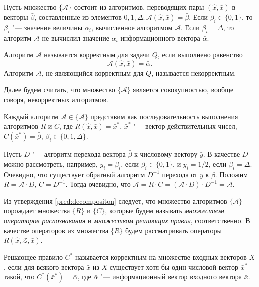 Пусть множество $\{\mathcal{A}\}$ состоит из алгоритмов, переводящих пары $(\hat{x},\bar{x})$ в векторы $\bar{\beta}$, составленные из элементов $0,1,\Delta:\mathcal{A}(\hat{x},\bar{x})=\bar{\beta}$. Если $\beta_i\in\{0,1\}$, то $\beta_i$ "--- значение величины $\alpha_i$, вычисленное алгоритмом $\mathcal{A}$. Если $\beta_i=\Delta$, то алгоритм $\mathcal{A}$ не вычислил значение $\alpha_i$ информационного вектора $\bar\alpha$.
	
\begin{Def}
	Алгоритм $\mathcal{A}$ называется корректным для задачи $Q$, если выполнено равенство
	\begin{equation}
		\mathcal{A}(\hat{x},\bar{x})=\bar{\alpha}.
	\end{equation}
	Алгоритм $\mathcal{A}$, не являющийся корректным для $Q$, называется некорректным.
\end{Def}

Далее будем считать, что множество $\{\mathcal{A}\}$ является совокупностью, вообще говоря, некорректных алгоритмов.
	
\begin{Pred}
	\label{pred:decompositon}
	Каждый алгоритм $\mathcal{A}\in\{\mathcal{A}\}$ представим как последовательность выполнения алгоритмов $R$ и $C$, где $R(\hat{x},\bar{x})=\bar{x}^*$, $\bar{x}^*$ "--- вектор действительных чисел, $C(\bar{x}^*)=\bar{\beta}$, $\beta_i\in\{0,1,\Delta\}$.
\end{Pred}
	
\begin{Proof}
	Пусть $D$ "--- алгоритм перехода вектора $\bar{\beta}$ к числовому вектору $\bar{y}$. В качестве $D$ можно рассмотреть, например, $y_i=\beta_i$, если $\beta_i\in\{0,1\}$, и $y_i=1/2$, если $\beta_i=\Delta$. Очевидно, что существует обратный алгоритм $D^{-1}$ перехода от $\bar{y}$ к $\bar{\beta}$. Положим $R=\mathcal{A}{\cdot}D$, $C=D^{-1}$. Тогда очевидно, что $\mathcal{A}=R{\cdot}C=(\mathcal{A}{\cdot}D){\cdot}D^{-1}=\mathcal{A}$.
\end{Proof}

Из утверждения \ref{pred:decompositon} следует, что множество алгоритмов $\{\mathcal{A}\}$ порождает множества $\{R\}$ и $\{C\}$, которые будем называть \textit{множеством операторов распознавания} и \textit{множеством решающих правил}, соответственно. В качестве операторов из множества $\{R\}$ будем рассматривать операторы $R(\hat{x},\mathcal{Z},\bar{x})$.
	
\begin{Def}
	Решающее правило $C^*$ называется корректным на множестве входных векторов $X$, если для всякого вектора $\bar{x}$ из $X$ существует хотя бы один числовой вектор $\bar{x}^*$ такой, что $C^*(\bar{x}^*)=\bar{\alpha}$, где $\bar{\alpha}$ "--- информационный вектор входного вектора $\bar{x}$.
\end{Def}

